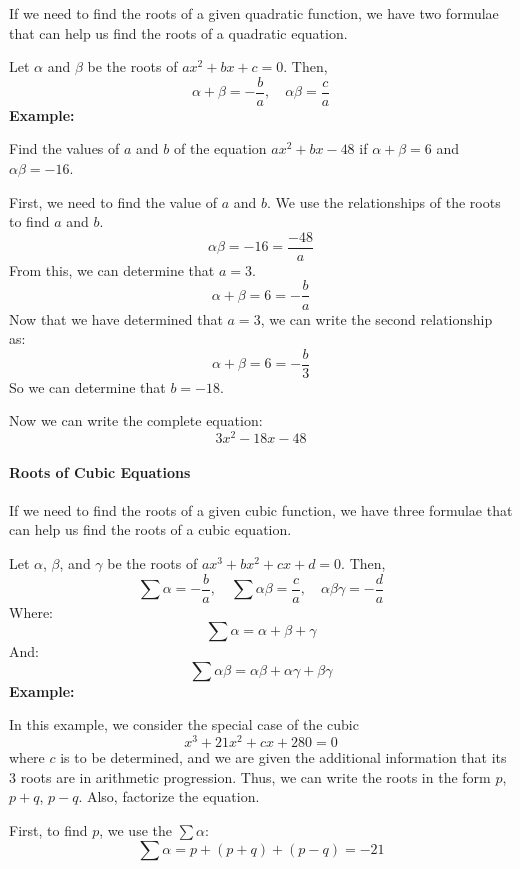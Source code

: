 If we need to find the roots of a given quadratic function, we have two formulae that can help us find the roots of a quadratic equation.



Let $\alpha$ and $\beta$ be the roots of $ax^2 + bx + c = 0$. Then,
$$
\alpha + \beta = -\frac{b}{a}, \quad \alpha \beta = \frac{c}{a}
$$
\textbf{Example:}



Find the values of $a$ and $b$ of the equation $ax^2 + bx - 48$ if $\alpha + \beta = 6$ and $\alpha \beta = -16$.



First, we need to find the value of $a$ and $b$. We use the relationships of the roots to find $a$ and $b$.
$$
\alpha \beta = -16 = \frac{-48}{a}
$$
From this, we can determine that $a = 3$.
$$
\alpha + \beta = 6 = -\frac{b}{a}
$$
Now that we have determined that $a = 3$, we can write the second relationship as:
$$
\alpha + \beta = 6 = -\frac{b}{3}
$$
So we can determine that $b = -18$.



Now we can write the complete equation:
$$
3x^2 - 18x - 48
$$
\paragraph{Roots of Cubic Equations}



If we need to find the roots of a given cubic function, we have three formulae that can help us find the roots of a cubic equation.



Let $\alpha$, $\beta$, and $\gamma$ be the roots of $ax^3 + bx^2 + cx + d = 0$. Then,
$$
\sum \alpha = -\frac{b}{a}, \quad \sum \alpha \beta = \frac{c}{a}, \quad \alpha \beta \gamma = -\frac{d}{a}
$$
Where:
$$
\sum \alpha = \alpha + \beta + \gamma
$$
And:
$$
\sum \alpha \beta = \alpha \beta + \alpha \gamma + \beta \gamma
$$
\textbf{Example:}



In this example, we consider the special case of the cubic 
$$
x^3 + 21x^2 + cx + 280 = 0
$$ 
where $c$ is to be determined, and we are given the additional information that its 3 roots are in arithmetic progression. Thus, we can write the roots in the form $p$, $p + q$, $p - q$. Also, factorize the equation.



First, to find $p$, we use the $\sum \alpha$:
$$
\sum \alpha = p + (p + q) + (p - q) = -21
$$



